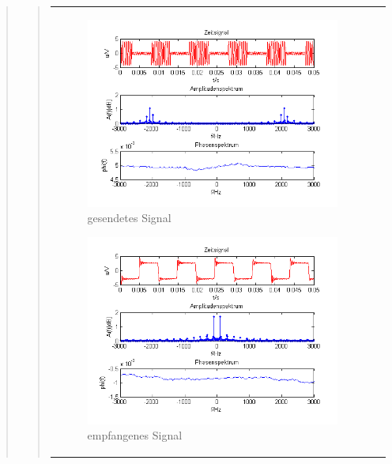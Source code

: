 \begin{quote}
\begin{quote}
\begin{center}
\begin{tabular}{ll}
\begin{minipage}{0.67\textwidth}
                \begin{figure}[H]
                    \label{fig:DemodreieckmT}
                    \includegraphics[scale=0.7]{Bilder/Am_Rec_2k_100Hz_mo}
                    \caption{gesendetes Signal}
                \end{figure}
        
            \end{minipage}
        
            \begin{minipage}{0.67\textwidth}
                \begin{figure}[H]
                    \label{fig:DemodreieckmT2}
                    \includegraphics[scale=0.7]{Bilder/Demo_Rec_2k_100Hz_mo_mitTiefpass}
                    \caption{empfangenes Signal}
                \end{figure}
        
            \end{minipage}
        
        \end{tabular}
        \end{center}
        
    \end{quote}
    
\end{quote}


